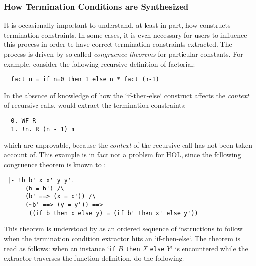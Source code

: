 \subsubsection{How Termination Conditions are Synthesized}

It is occasionally important to understand, at least in part, how
 constructs termination constraints. In some cases, it is
even necessary for users to influence this process in order to have correct
termination constraints extracted. The process is driven by so-called
\emph{congruence theorems} for particular \HOL{} constants. 
For example, consider the following recursive definition of factorial:
%
\begin{hol}
\begin{verbatim}
  fact n = if n=0 then 1 else n * fact (n-1)
\end{verbatim}
\end{hol}
%
In the absence of knowledge of how the `if-then-else` construct
affects the \emph{context} of recursive calls,  would 
extract the termination constraints:
%
\begin{hol}
\begin{verbatim}
  0. WF R
  1. !n. R (n - 1) n
\end{verbatim}
\end{hol}
%
which are unprovable, because the \emph{context} of the recursive call has not
been taken account of. This example is in fact not a problem for HOL,
since the following congruence theorem is known to :
%
\begin{hol}
\begin{verbatim}
 |- !b b' x x' y y'.
      (b = b') /\
      (b' ==> (x = x')) /\
      (~b' ==> (y = y')) ==>
       ((if b then x else y) = (if b' then x' else y'))
\end{verbatim}
\end{hol}
%
This theorem is understood by  as an ordered sequence
of instructions to follow when the termination condition extractor
hits an `if-then-else`. The theorem is read as follows: when an
instance `\texttt{if} $B$ \texttt{then} $X$ \texttt{else} $Y$` is 
encountered while the extractor traverses the function definition, 
do the following:
